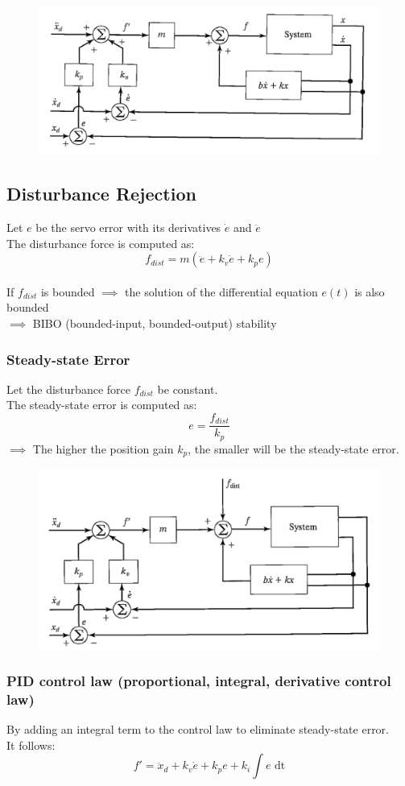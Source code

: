 \documentclass[10pt,a4paper]{article}
\begin{document}
\begin{figure}[H]
	\includegraphics[width=0.5\columnwidth]{imgs/trajectory_following.png}
\end{figure}

\subsection{Disturbance Rejection}
Let $e$ be the servo error with its derivatives $\dot e$ and $\ddot e$ \\
The disturbance force is computed as:
$$
	f_{dist} = m(\ddot e + k_v \dot e + k_p e)
$$
\\

If $f_{dist}$ is bounded $\implies$ the solution of the differential equation $e(t)$ is also bounded \\
$\implies$ BIBO (bounded-input, bounded-output) stability

\subsubsection{Steady-state Error}
Let the disturbance force $f_{dist}$ be constant. \\
The steady-state error is computed as:
$$
	e = \frac{f_{dist}}{k_p}
$$
$\implies$ The higher the position gain $k_p$, the smaller will be the steady-state error.

\begin{figure}[H]
	\includegraphics[width=0.5\columnwidth]{imgs/trajectory_following_fdist.png}
\end{figure}

\subsubsection{PID control law (proportional, integral, derivative control law)}
By adding an integral term to the control law to eliminate steady-state error. \\
It follows: \\
$$
	f' = \ddot x_d + k_v \dot e + k_p e + k_i \int e \textrm{ dt}
$$
\\
\end{document}
